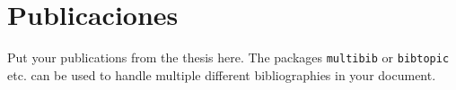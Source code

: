 \chapter*{Publicaciones}

\noindent Put your publications from the thesis here.
The packages \texttt{multibib} or \texttt{bibtopic} etc.
can be used to handle multiple different bibliographies in your document.

\begin{refsection}[ownpubs]
    \small~\nocite{*} %
    \printbibliography[heading=none]
\end{refsection}